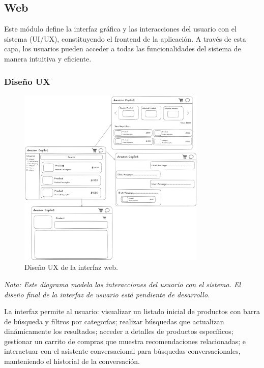 \documentclass[12pt]{article}
\begin{document}
\subsection{Web}

Este módulo define la interfaz gráfica y las interacciones del usuario con el sistema (UI/UX), constituyendo el frontend de la aplicación. A través de esta capa, los usuarios pueden acceder a todas las funcionalidades del sistema de manera intuitiva y eficiente.

\subsubsection{Diseño UX}

\begin{figure}[H]
    \centering
    \includegraphics[width=0.8\textwidth]{ux.png}
    \caption{Diseño UX de la interfaz web.}
    \label{fig:ux_design}
\end{figure}

\noindent \textit{Nota: Este diagrama modela las interacciones del usuario con el sistema. El diseño final de la interfaz de usuario está pendiente de desarrollo.}

\vspace{0.75cm}

La interfaz permite al usuario: visualizar un listado inicial de productos con barra de búsqueda y filtros por categorías; realizar búsquedas que actualizan dinámicamente los resultados; acceder a detalles de productos específicos; gestionar un carrito de compras que muestra recomendaciones relacionadas; e interactuar con el asistente conversacional para búsquedas conversacionales, manteniendo el historial de la conversación.
\end{document}
